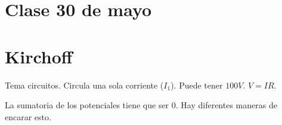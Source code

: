 \section{Clase 30 de mayo}

\section{Kirchoff}

Tema circuitos.
Circula una sola corriente (\(I_1\)).
Puede tener \(100V\).
\(V=IR\).

La sumatoria de los potenciales tiene que ser 0.
Hay diferentes maneras de encarar esto.
